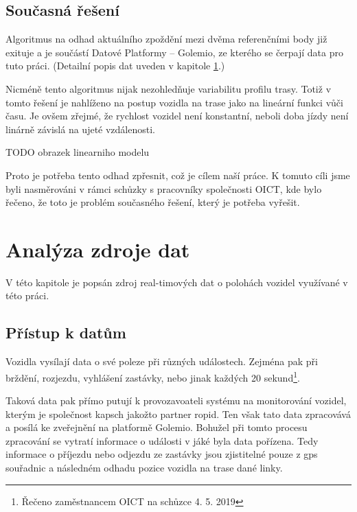 \subsection{Současná řešení} \label{subsection:soucasna_reseni_odhadu}

Algoritmus na odhad aktuálního zpoždění mezi dvěma referenčními body již exituje a je součástí Datové Platformy -- Golemio, ze kterého se čerpají data pro tuto práci. (Detailní popis dat uveden v kapitole \ref{chapter:analyza_zdroje}.)

\bigbreak

Nicméně tento algoritmus nijak nezohledňuje variabilitu profilu trasy. Totiž v tomto řešení je nahlíženo na postup vozidla na trase jako na lineární funkci vůči času. Je ovšem zřejmé, že rychlost vozidel není konstantní, neboli doba jízdy není linárně závislá na ujeté vzdálenosti.

\bigbreak

TODO obrazek linearniho modelu

\bigbreak

Proto je potřeba tento odhad zpřesnit, což je cílem naší práce. K tomuto cíli jsme byli nasměrováni v rámci schůzky s pracovníky společnosti OICT, kde bylo řečeno, že toto je problém současného řešení, který je potřeba vyřešit.


\section{Analýza zdroje dat} \label{chapter:analyza_zdroje}

V této kapitole je popsán zdroj real-timových dat o polohách vozidel využívané v této práci.

\subsection{Přístup k datům}

Vozidla vysílají data o své poleze při různých událostech. Zejména pak při brždění, rozjezdu, vyhlášení zastávky, nebo jinak každých 20 sekund\footnote{Řečeno zaměstnancem OICT na schůzce 4. 5. 2019}.

\bigbreak

Taková data pak přímo putují k provozavoateli systému na monitorování vozidel, kterým je společnost \gls{kapsch} jakožto partner \gls{ropid}. Ten však tato data zpracovává a posílá ke zveřejnění na platformě Golemio. Bohužel při tomto procesu zpracování se vytratí informace o události v jáké byla data pořízena. Tedy informace o příjezdu nebo odjezdu ze zastávky jsou zjistitelné pouze z \gls{gps} souřadnic a následném odhadu pozice vozidla na trase dané linky.


